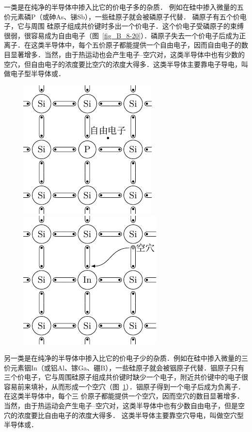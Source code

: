 一类是在纯净的半导体中掺入比它的价电子多的杂质．
例如在硅中掺入微量的五价元素磷P（或砷As、锑Sb），一些硅原子就会被磷原子代替．
磷原子有五个价电子，它与周围
硅原子组成共价键时多出一个价电子．这个价电子受磷原子的束缚很弱，很容易成为自由电子（图~\ref{fig_B_8-20}）．磷原子失去一个价电子后成为正离子．在这类半导体中，每个五价原子都能提供一个自由电子，因而自由电子的数目显著增多．当然，由于热运动也会产生电子--空穴对，这类半导体中也有少数的空穴，但自由电子的浓度要比空穴的浓度大得多．这类半导体主要靠电子导电，叫做电子型半导体或．
\begin{figure}[htbp]
    \centering
    \begin{minipage}[t]{0.48\textwidth}
        \centering
        \includegraphics{fig/B/8-20.pdf}
        \caption{}\label{fig_B_8-20}
    \end{minipage}
    \begin{minipage}[t]{0.48\textwidth}
        \centering
        \includegraphics{fig/B/8-21.pdf}
        \caption{}\label{fig_B_8-21}
    \end{minipage}
\end{figure}

另一类是在纯净的半导体中掺入比它的价电子少的杂质．例如在硅中掺入微量的三价元素铟In（或铝Al、镓Ga、硼B），一些硅原子就会被铟原子代替．铟原子只有三个价电子，它与周围硅原子组成共价键时缺少一个电子，附近共价键中的电子很容易前来填补，从而形成一个空穴（图~\ref{fig_B_8-21}）．铟原子得到一个电子后成为负离子．在这类半导体中，每个三
价原子都能提供一个空穴，因而空穴的数目显著增多．当然，由于热运动会产生电子--空穴对，这类半导体中也有少数自由电子，但是空穴的浓度要比自由电子的浓度大得多．
这类半导体主要靠空穴导电，叫做空穴型半导体或．


